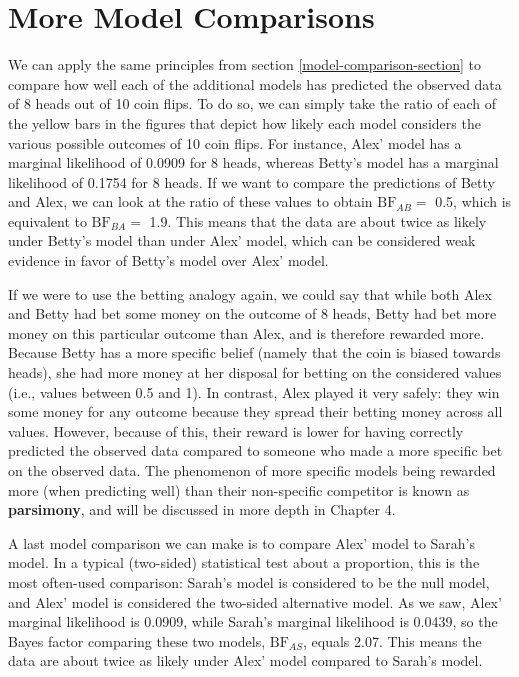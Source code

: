 \documentclass[
]{book}
\begin{document}
\hypertarget{more-model-comparison-section}{%
\section{More Model Comparisons}\label{more-model-comparison-section}}

We can apply the same principles from section \ref{model-comparison-section} to compare how well each of the additional models has predicted the observed data of 8 heads out of 10 coin flips. To do so, we can simply take the ratio of each of the yellow bars in the figures that depict how likely each model considers the various possible outcomes of 10 coin flips. For instance, Alex' model has a marginal likelihood of 0.0909 for 8 heads, whereas Betty's model has a marginal likelihood of 0.1754 for 8 heads. If we want to compare the predictions of Betty and Alex, we can look at the ratio of these values to obtain \(\text{BF}_{AB} =\) 0.5, which is equivalent to \(\text{BF}_{BA} =\) 1.9. This means that the data are about twice as likely under Betty's model than under Alex' model, which can be considered weak evidence in favor of Betty's model over Alex' model.

If we were to use the betting analogy again, we could say that while both Alex and Betty had bet some money on the outcome of 8 heads, Betty had bet more money on this particular outcome than Alex, and is therefore rewarded more. Because Betty has a more specific belief (namely that the coin is biased towards heads), she had more money at her disposal for betting on the considered values (i.e., values between 0.5 and 1). In contrast, Alex played it very safely: they win some money for any outcome because they spread their betting money across all values. However, because of this, their reward is lower for having correctly predicted the observed data compared to someone who made a more specific bet on the observed data. The phenomenon of more specific models being rewarded more (when predicting well) than their non-specific competitor is known as \textbf{parsimony}, and will be discussed in more depth in Chapter 4.

A last model comparison we can make is to compare Alex' model to Sarah's model. In a typical (two-sided) statistical test about a proportion, this is the most often-used comparison: Sarah's model is considered to be the null model, and Alex' model is considered the two-sided alternative model. As we saw, Alex' marginal likelihood is 0.0909, while Sarah's marginal likelihood is 0.0439, so the Bayes factor comparing these two models, \(\text{BF}_{AS}\), equals 2.07. This means the data are about twice as likely under Alex' model compared to Sarah's model.
\end{document}
